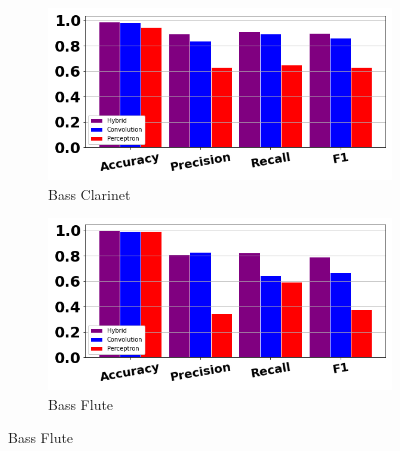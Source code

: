 \documentclass[12pt,letterpaper]{article}
\begin{document}
\begin{figure}[H]
	\begin{subfigure}[b]{0.45\textwidth}
	\centering
	\includegraphics[width=\textwidth]{../FiguresClasses/BassClarinet}
	\caption{Bass Clarinet}
	\end{subfigure}	
	\hfill
	\begin{subfigure}[b]{0.45\textwidth}
	\centering
	\includegraphics[width=\textwidth]{../FiguresClasses/BassFlute}
	\caption{Bass Flute}
	\end{subfigure}	
	

\end{figure}
\end{document}
